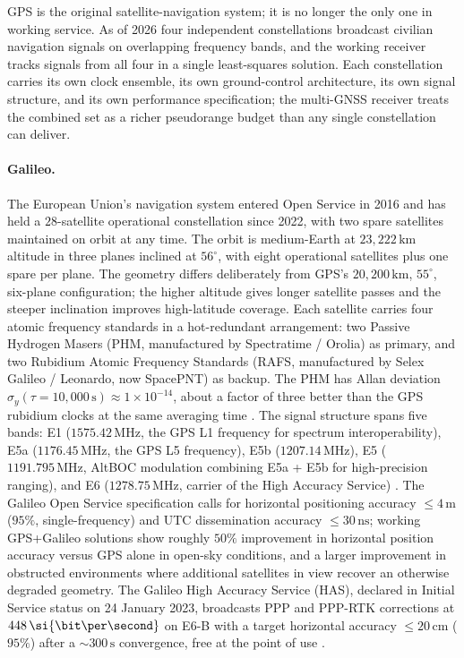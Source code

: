 GPS is the original satellite-navigation system; it is no longer
the only one in working service. As of 2026 four independent
constellations broadcast civilian navigation signals on overlapping
frequency bands, and the working receiver tracks signals from all
four in a single least-squares solution. Each constellation carries
its own clock ensemble, its own ground-control architecture, its
own signal structure, and its own performance specification; the
multi-GNSS receiver treats the combined set as a richer pseudorange
budget than any single constellation can deliver.

\paragraph{Galileo.} The European Union's navigation system entered
Open Service in 2016 and has held a $28$-satellite operational
constellation since 2022, with two spare satellites maintained on
orbit at any time. The orbit is medium-Earth at $23{,}222 \,\si{
\kilo\meter}$ altitude in three planes inclined at $56^{\circ}$,
with eight operational satellites plus one spare per plane. The
geometry differs deliberately from GPS's $20{,}200 \,\si{\kilo
\meter}$, $55^{\circ}$, six-plane configuration; the higher altitude
gives longer satellite passes and the steeper inclination improves
high-latitude coverage. Each satellite carries four atomic
frequency standards in a hot-redundant arrangement: two Passive
Hydrogen Masers (PHM, manufactured by Spectratime / Orolia) as
primary, and two Rubidium Atomic Frequency Standards (RAFS,
manufactured by Selex Galileo / Leonardo, now SpacePNT) as
backup. The PHM has Allan deviation $\sigma_{y}(\tau = 10{,}000
\,\si{\second}) \approx 1 \times 10^{-14}$, about a factor of three
better than the GPS rubidium clocks at the same averaging time
\cite{web:ch06t3b-spectratime-phm-2024,
web:ch06t3b-spectratime-rafs-2024}. The signal structure spans five
bands: E1 ($1575.42 \,\si{\mega\hertz}$, the GPS L1 frequency for
spectrum interoperability), E5a ($1176.45 \,\si{\mega\hertz}$, the
GPS L5 frequency), E5b ($1207.14 \,\si{\mega\hertz}$), E5
($1191.795 \,\si{\mega\hertz}$, AltBOC modulation combining E5a +
E5b for high-precision ranging), and E6 ($1278.75 \,\si{\mega
\hertz}$, carrier of the High Accuracy Service)
\cite{web:ch06t3b-euspa-galileo-os-sdd-2023}. The Galileo Open
Service specification calls for horizontal positioning accuracy
$\leq 4 \,\si{\meter}$ ($95\%$, single-frequency) and UTC
dissemination accuracy $\leq 30 \,\si{\nano\second}$; working
GPS+Galileo solutions show roughly $50\%$ improvement in horizontal
position accuracy versus GPS alone in open-sky conditions, and a
larger improvement in obstructed environments where additional
satellites in view recover an otherwise degraded geometry. The
Galileo High Accuracy Service (HAS), declared in Initial Service
status on 24 January 2023, broadcasts PPP and PPP-RTK corrections
at $448 \,\si{\bit\per\second}$ on E6-B with a target horizontal
accuracy $\leq 20 \,\si{\centi\meter}$ ($95\%$) after a
$\sim 300 \,\si{\second}$ convergence, free at the point of use
\cite{web:ch06t3b-euspa-galileo-has-sdd-2023}.

